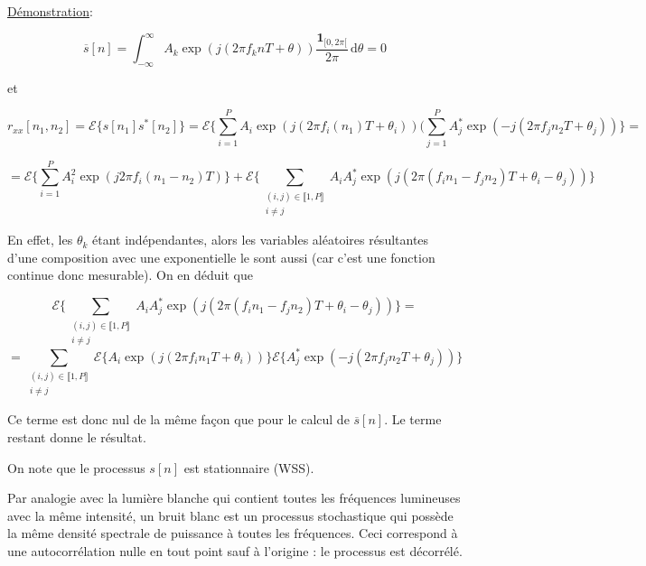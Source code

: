 \documentclass{article}
\begin{document}
\vspace*{10pt}

\underline{Démonstration}:

\[ \overline{s}[n] = \int_{-\infty}^{\infty} A_k \exp(j (2\pi f_k n T + \theta)) \frac{\mathbf{1}_{[0, 2\pi[}}{2\pi}\, \mathrm{d}\theta = 0  \]

et 

\[ r_{xx}[n_1,n_2] = \mathcal E \{ s[n_1]s^*[n_2] \} = \mathcal E \{ \sum_{i=1}^{P} A_i \exp(j(2\pi f_i (n_1) T + \theta _i))(\sum_{j=1}^{P} A_j^* \exp(-j(2\pi f_j n_2 T + \theta _j)) \} = \] 

\[  =  \mathcal E \{ \sum_{i=1}^{P} A_i^2 \exp(j 2\pi f_i (n_1-n_2) T)\} + \mathcal E \{ \sum\limits_{\substack{(i,j) \in \llbracket 1,P\rrbracket  \\ i \neq j}}  A_i A_j^* \exp(j(2\pi ( f_i n_1 - f_j n_2) T + \theta _i - \theta_j)) \}  \]


En effet, les \( \theta_k \) étant indépendantes, alors les variables aléatoires résultantes d'une composition avec une exponentielle le sont aussi (car c'est une fonction continue donc mesurable). On en déduit que


\[ \mathcal E \{ \sum\limits_{\substack{(i,j) \in \llbracket 1,P\rrbracket  \\ i \neq j}}  A_i A_j^* \exp(j(2\pi ( f_i n_1 - f_j n_2) T + \theta _i - \theta_j)) \} = \]
\[=  \sum\limits_{\substack{(i,j) \in \llbracket 1,P\rrbracket  \\ i \neq j}} \mathcal E \{ A_i \exp(j(2\pi f_i n_1 T + \theta _i)) \} \mathcal E \{ A_j^* \exp(-j(2\pi f_j n_2 T + \theta _j)) \} \]


Ce terme est donc nul de la même façon que pour le calcul de \( \overline{s}[n]\).
Le terme restant donne le résultat.

On note que le processus \(s[n]\) est stationnaire (WSS). 




\newpage

Par analogie avec la lumière blanche qui contient toutes les fréquences lumineuses avec la même intensité, un bruit blanc est un processus stochastique qui possède la même densité spectrale de puissance à toutes les fréquences. Ceci correspond à une autocorrélation nulle en tout point sauf à l'origine : le processus est décorrélé.
\end{document}
